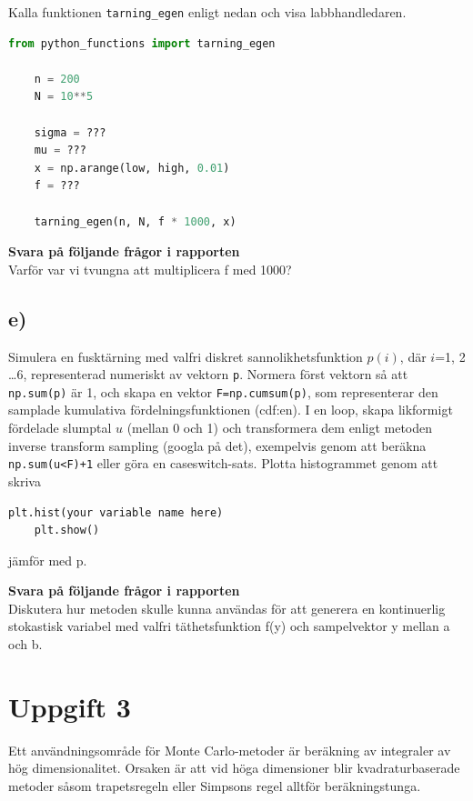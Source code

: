 \documentclass[a4paper]{article}
\begin{document}
Kalla funktionen \lstinline{tarning_egen} enligt nedan och visa labbhandledaren.

\begin{lstlisting}[language=Python]
    from python_functions import tarning_egen

    n = 200
    N = 10**5

    sigma = ???
    mu = ???
    x = np.arange(low, high, 0.01)
    f = ???

    tarning_egen(n, N, f * 1000, x)
\end{lstlisting}

\textbf{Svara på följande frågor i rapporten}\\
Varför var vi tvungna att multiplicera f med 1000?

\newpage
\subsection{e)}
Simulera en fusktärning med valfri diskret sannolikhetsfunktion \( p(i) \), där \(i\)=1, 2 \ldots 6,
representerad numeriskt av vektorn \lstinline{p}. Normera först vektorn så att \lstinline{np.sum(p)} är 1,
och skapa en vektor \lstinline{F=np.cumsum(p)}, som representerar den samplade kumulativa
fördelningsfunktionen (cdf:en). I en loop, skapa likformigt fördelade slumptal \( u \)
(mellan 0 och 1) och transformera dem enligt metoden inverse transform sampling
(googla på det), exempelvis genom att beräkna \lstinline{np.sum(u<F)+1} eller göra en caseswitch-sats.
Plotta histogrammet genom att skriva
\begin{lstlisting}[language=Python]
    plt.hist(your variable name here)
    plt.show()
\end{lstlisting}
jämför med p.

\textbf{Svara på följande frågor i rapporten}\\
Diskutera hur metoden skulle kunna användas för att generera en
kontinuerlig stokastisk variabel med valfri täthetsfunktion f(y) och sampelvektor y
mellan a och b.
\section{Uppgift 3}
Ett användningsområde för Monte Carlo-metoder är beräkning av integraler av hög dimensionalitet.
Orsaken är att vid höga dimensioner blir kvadraturbaserade metoder såsom trapetsregeln eller
Simpsons regel alltför beräkningstunga.
\end{document}
